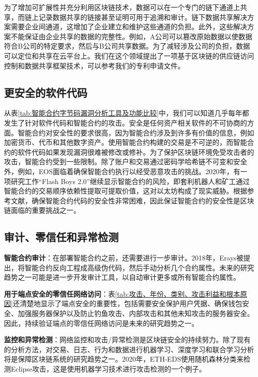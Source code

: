 \begin{translation}
为了增加可扩展性并充分利用区块链技术，数据可以在一个专门的链下通道上共享，而链上记录数据共享的链接甚至证明可用于追溯和审计。链下数据共享解决方案需要企业间通道，这增加了企业建立和维护这些通道的负担。此外，这些解决方案不能保证由企业共享的数据的完整性。例如，A公司可以篡改原始数据以使数据符合B公司的特定要求，然后与B公司共享数据。为了减轻涉及公司的负担，数据可以定位和共享在云平台上。我们在这个领域提出了一项基于区块链的供应链访问控制和数据共享框架技术，可以参考我们的专利申请文件\cite{art134}。

\subsection{更安全的软件代码}
从表\ref{tab:智能合约字节码漏洞分析工具及功能比较}中，我们可以知道几乎每年都发生了针对软件代码和智能合约的攻击。安全是任何资产相关软件的不可协商的方面。智能合约对安全性的要求很高，因为智能合约涉及到许多有价值的信息，例如加密货币、代币和其他数字资产。使用智能合约构建的交易是不可逆的，而智能合约的软件代码如果发现漏洞很难被修改或修补\cite{art135}。为了保护区块链环境免受攻击者的攻击，智能合约受到一些限制。除了账户和交易通过密码学哈希链不可变和安全外，例如，EOS面临着确保智能合约执行以经受恶意攻击的挑战\cite{art136}。2020年，有一项研究工作“Flash Boys 2.0”继续显示智能合约的风险，即套利机器人和矿工通过智能合约的交易顺序依赖性提取可提取价值，这对以太坊构成了现实威胁\cite{art137}。根据参考文献\cite{art135}，确保智能合约代码的安全性非常困难，因此保证智能合约的安全性是区块链面临的重要挑战之一。

\subsection{审计、零信任和异常检测}
\textbf{智能合约审计}：在部署智能合约之前，还需要进行一步审计。2018年，Erays被提出，将智能合约反向工程成高级伪代码，然后手动分析几个合约属性\cite{art138}。未来的研究趋势之一可能是进一步开发审计工具，以自动审计更多或所有智能合约属性。

\textbf{用于端点安全的零信任网络访问}：表\ref{tab:攻击、年份、类别、攻击利益和根本原因}还清楚地显示了端点安全的重要性，包括需要安全保护用户凭据、确保钱包安全、加强服务器保护以及防止钓鱼攻击、内部攻击和其他未知攻击的服务器安全。因此，持续验证端点的零信任网络访问是未来的研究趋势之一。

\textbf{监控和异常检测}：网络监控和攻击/异常检测是区块链安全的持续努力。除了现有的分析方法\cite{art139}，对交易、日志、行为和数据进行机器学习、深度学习和联合学习分析将是保障区块链系统的研究趋势之一。2020年，ETH-EDS使用随机森林分类来检测Eclipse攻击\cite{art140}，这是使用机器学习技术进行攻击检测的一个例子。


\end{translation}
